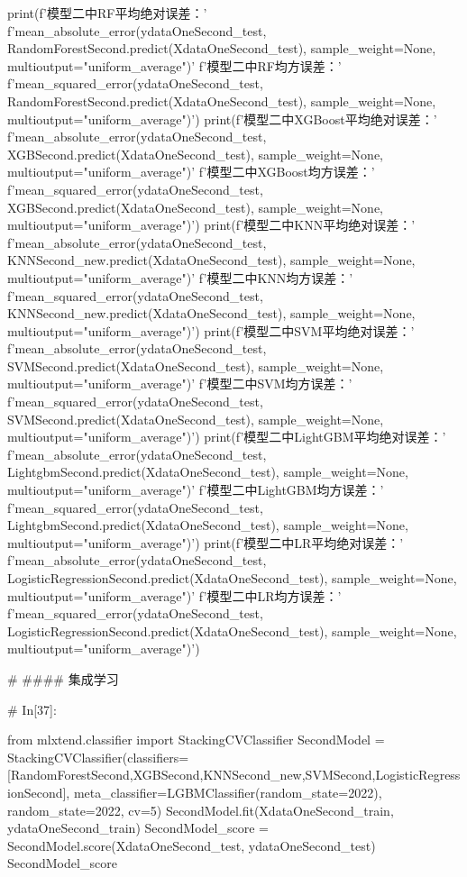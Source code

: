 \documentclass{MathorCupmodeling}
\begin{document}
\begin{python}
print(f'模型二中RF平均绝对误差：'
      f'{mean_absolute_error(ydataOneSecond_test, RandomForestSecond.predict(XdataOneSecond_test), sample_weight=None, multioutput="uniform_average")}\n'
      f'模型二中RF均方误差：'
      f'{mean_squared_error(ydataOneSecond_test, RandomForestSecond.predict(XdataOneSecond_test), sample_weight=None, multioutput="uniform_average")}')
print(f'模型二中XGBoost平均绝对误差：'
      f'{mean_absolute_error(ydataOneSecond_test, XGBSecond.predict(XdataOneSecond_test), sample_weight=None, multioutput="uniform_average")}\n'
      f'模型二中XGBoost均方误差：'
      f'{mean_squared_error(ydataOneSecond_test, XGBSecond.predict(XdataOneSecond_test), sample_weight=None, multioutput="uniform_average")}')
print(f'模型二中KNN平均绝对误差：'
      f'{mean_absolute_error(ydataOneSecond_test, KNNSecond_new.predict(XdataOneSecond_test), sample_weight=None, multioutput="uniform_average")}\n'
      f'模型二中KNN均方误差：'
      f'{mean_squared_error(ydataOneSecond_test, KNNSecond_new.predict(XdataOneSecond_test), sample_weight=None, multioutput="uniform_average")}')
print(f'模型二中SVM平均绝对误差：'
      f'{mean_absolute_error(ydataOneSecond_test, SVMSecond.predict(XdataOneSecond_test), sample_weight=None, multioutput="uniform_average")}\n'
      f'模型二中SVM均方误差：'
      f'{mean_squared_error(ydataOneSecond_test, SVMSecond.predict(XdataOneSecond_test), sample_weight=None, multioutput="uniform_average")}')
print(f'模型二中LightGBM平均绝对误差：'
      f'{mean_absolute_error(ydataOneSecond_test, LightgbmSecond.predict(XdataOneSecond_test), sample_weight=None, multioutput="uniform_average")}\n'
      f'模型二中LightGBM均方误差：'
      f'{mean_squared_error(ydataOneSecond_test, LightgbmSecond.predict(XdataOneSecond_test), sample_weight=None, multioutput="uniform_average")}')
print(f'模型二中LR平均绝对误差：'
      f'{mean_absolute_error(ydataOneSecond_test, LogisticRegressionSecond.predict(XdataOneSecond_test), sample_weight=None, multioutput="uniform_average")}\n'
      f'模型二中LR均方误差：'
      f'{mean_squared_error(ydataOneSecond_test, LogisticRegressionSecond.predict(XdataOneSecond_test), sample_weight=None, multioutput="uniform_average")}')


# #### 集成学习

# In[37]:


from mlxtend.classifier import StackingCVClassifier
SecondModel = StackingCVClassifier(classifiers=[RandomForestSecond,XGBSecond,KNNSecond_new,SVMSecond,LogisticRegressionSecond], meta_classifier=LGBMClassifier(random_state=2022), random_state=2022, cv=5)
SecondModel.fit(XdataOneSecond_train, ydataOneSecond_train)
SecondModel_score = SecondModel.score(XdataOneSecond_test, ydataOneSecond_test)
SecondModel_score



\end{python}
\end{document}
